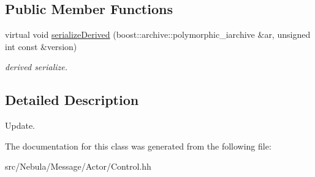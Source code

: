 \subsection*{\-Public \-Member \-Functions}
\begin{DoxyCompactItemize}
\item 
\hypertarget{classNeb_1_1Message_1_1Actor_1_1Control_1_1RigidBody_1_1IUpdate_afd3bb8e9ba2764ae846638391017bf64}{virtual void \hyperlink{classNeb_1_1Message_1_1Actor_1_1Control_1_1RigidBody_1_1IUpdate_afd3bb8e9ba2764ae846638391017bf64}{serialize\-Derived} (boost\-::archive\-::polymorphic\-\_\-iarchive \&ar, unsigned int const \&version)}\label{classNeb_1_1Message_1_1Actor_1_1Control_1_1RigidBody_1_1IUpdate_afd3bb8e9ba2764ae846638391017bf64}

\begin{DoxyCompactList}\small\item\em derived serialize. \end{DoxyCompactList}\end{DoxyCompactItemize}


\subsection{\-Detailed \-Description}
\-Update. 

\-The documentation for this class was generated from the following file\-:\begin{DoxyCompactItemize}
\item 
src/\-Nebula/\-Message/\-Actor/\-Control.\-hh\end{DoxyCompactItemize}
